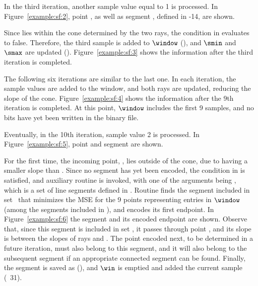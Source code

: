 \vspace{-5pt}


\vspace{-8pt}
In the third iteration, another sample value equal to 1 is processed. In Figure~\ref{example:sf:2}, point , as well as segment , defined in -14, are shown.


\vspace{-4pt}


\clearpage


Since  lies within the cone determined by the two rays, the condition in  evaluates to false. Therefore, the third sample is added to $\window$ (), and $\smin$ and $\smax$ are updated (). Figure~\ref{example:sf:3}  shows the information after the third iteration is completed. 




The following six iterations are similar to the last one. In each iteration, the sample values are added to the window, and both rays are updated, reducing the slope of the cone. Figure~\ref{example:sf:4} shows the information after the 9th iteration is completed. At this point, $\window$ includes the first 9 samples, and no bits have yet been written in the binary file. 




\clearpage


Eventually, in the 10th iteration, sample value 2 is processed. In Figure~\ref{example:sf:5}, point  and segment  are shown.




\vspace{-5pt}
For the first time, the incoming point, , lies outside of the cone, due to  having a smaller slope than \smin. Since no segment has yet been encoded, the condition in  is satisfied, and auxiliary routine \CAWinStart is invoked, with one of the arguments being \segmentSet, which is a set of line segments defined in . Routine \CAWinStart finds the segment included in set \segmentSet\ that minimizes the MSE for the 9 points representing entries in $\window$ (among the segments included in \segmentSet), and encodes its first endpoint. In Figure~\ref{example:sf:6} the segment and its encoded endpoint are shown. Observe that, since this segment is included in set \segmentSet, it passes through point \interPoint, and its slope is between the slopes of rays \smin and \smax. The point encoded next, to be determined in a future iteration, must also belong to this segment, and it will also belong to the subsequent segment if an appropriate connected segment can be found. Finally, the segment is saved as \segmentLastT (), and $\win$ is emptied and added the current sample (\Line~31).


